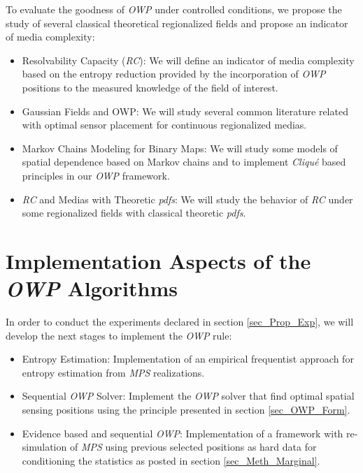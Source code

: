 To evaluate the goodness of \emph{OWP} under controlled conditions, we propose the study of several classical theoretical regionalized fields and propose an indicator of media complexity:
	\begin{itemize}
		\item {Resolvability Capacity (\emph{RC}): } We will define an indicator of media complexity based on the entropy reduction provided by the incorporation of \emph{OWP} positions to the measured knowledge of the field of interest.
		\item {Gaussian Fields and OWP: } We will study several common literature related with optimal sensor placement for continuous regionalized medias.
		\item {Markov Chains Modeling for Binary Maps: } We will study some models of spatial dependence based on Markov chains and to implement \emph{Cliqué} based principles in our \emph{OWP} framework.
		\item {\emph{RC} and Medias with Theoretic \emph{pdfs}: } We will study the behavior of \emph{RC} under some regionalized fields with classical theoretic \emph{pdfs}.
	\end{itemize}














	
	
	
\section{Implementation Aspects of the \emph{OWP} Algorithms} 
In order to conduct the experiments declared in section \ref{sec_Prop_Exp}, we will develop the next stages to implement the \emph{OWP} rule:

	\begin{itemize}
		\item {Entropy Estimation: }  Implementation of an empirical frequentist approach for entropy estimation from \emph{MPS} realizations.
		\item {Sequential \emph{OWP} Solver: } Implement the \emph{OWP} solver that find optimal spatial sensing positions using the principle presented in section \ref{sec_OWP_Form}.
		\item {Evidence based and sequential \emph{OWP}: } Implementation of a framework with re-simulation of \emph{MPS} using previous selected positions as hard data for conditioning the statistics as posted in section \ref{sec_Meth_Marginal}.
	\end{itemize}


